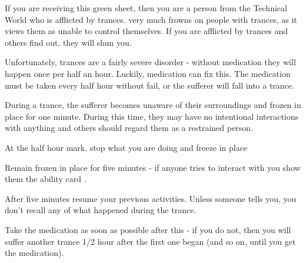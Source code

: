 \documentclass[green]{guildcamp3}
\begin{document}
	
	\name{\gTrance{}}
		
	If you are receiving this green sheet, then you are a person from the Technical World who is afflicted by trances. \bTechWorld{} very much frowns on people with trances, as it views them as unable to control themselves. If you are afflicted by trances and others find out, they will shun you. 
	
	Unfortunately, trances are a fairly severe disorder - without medication they will happen once per half an hour. Luckily, medication can fix this. The medication must be taken every half hour without fail, or the sufferer will fall into a trance. 
	
	During a trance, the sufferer becomes unaware of their surroundings and frozen in place for one minute. During this time, they may have no intentional interactions with anything and others should regard them as a restrained person. 
	
	
	\begin{enum}[Directions]
		\item At the half hour mark, stop what you are doing and freeze in place
		\item Remain frozen in place for five minutes - if anyone tries to interact with you show them the ability card \aTrance{}. 
		\item After five minutes resume your previous activities. Unless someone tells you, you don't recall any of what happened during the trance.
		\item Take the medication as soon as possible after this - if you do not, then you will suffer another trance 1/2 hour after the first one began (and so on, until you get the medication).
	\end{enum}
	
	
\end{document}
